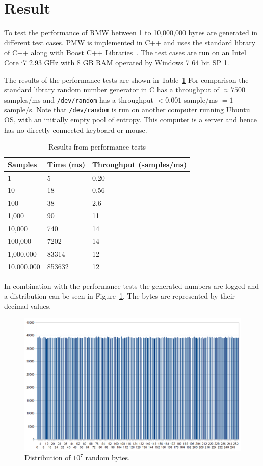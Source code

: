 \section{Result}
\label{sec:result}
To test the performance of RMW between 1 to 10,000,000 bytes are generated in different test cases.
PMW is implemented in C++ and uses the standard library of C++ along with Boost C++ Libraries~\citep{boost}.
The test cases are run on an Intel Core i7 2.93 GHz with 8 GB RAM operated by Windows 7 64 bit SP 1.

The results of the performance tests are shown in Table~\ref{tab:tests}
For comparison the standard library random number generator in C has a throughput of $\approx 7500$ samples/ms and \texttt{/dev/random} has a throughput $<0.001$ sample/ms $=1$ sample/s.
Note that \texttt{/dev/random} is run on another computer running Ubuntu OS, with an initially empty pool of entropy.
This computer is a server and hence has no directly connected keyboard or mouse.

\begin{table}
	\centering
		\begin{tabular}{|l|l|l|}
			\hline
			Samples&Time (ms)&Throughput (samples/ms)\\
			\hline
			1&5&0.20\\
			\hline
			10&18&0.56\\
			\hline
			100&38&2.6\\
			\hline
			1,000&90&11\\
			\hline
			10,000&740&14\\
			\hline
			100,000&7202&14\\
			\hline
			1,000,000&83314&12\\
			\hline
			10,000,000&853632&12\\
			\hline
		\end{tabular}
	\caption{Results from performance tests}
	\label{tab:tests}
\end{table}

In combination with the performance tests the generated numbers are logged and a distribution can be seen in Figure~\ref{fig:distribution}.
The bytes are represented by their decimal values.

\begin{figure}
	\centering
		\includegraphics[width=\columnwidth]{image/distribution.png}
	\caption{Distribution of $10^7$ random bytes.}
	\label{fig:distribution}
\end{figure}
